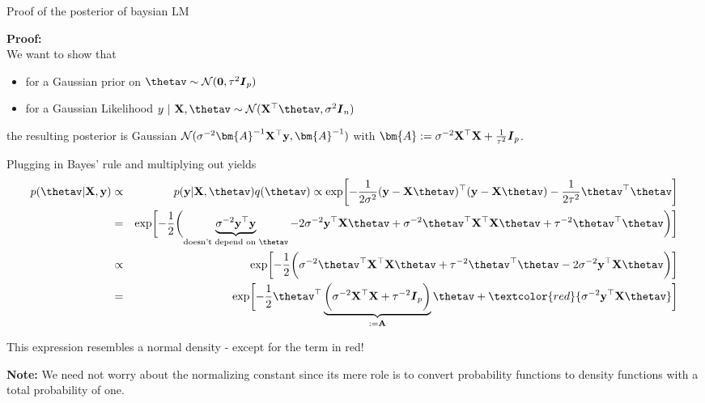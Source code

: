 \documentclass[11pt,compress,t,notes=noshow, xcolor=table]{beamer}
\begin{document}

\begin{vbframe}{Proof of the posterior of baysian LM}
\begin{footnotesize}
\textbf{Proof:}\\
    We want to show that 
    \begin{itemize}
      \item for a Gaussian prior on $\thetav \sim \mathcal{N}(\zero, \tau^2 \id_p)$
      \item for a Gaussian Likelihood $y ~|~ \Xmat, \thetav \sim \mathcal{N}(\Xmat^\top \thetav, \sigma^2 \id_n)$ 
    \end{itemize}
    the resulting posterior is Gaussian $\mathcal{N}(\sigma^{-2}\bm{A}^{-1}\Xmat^\top\yv, \bm{A}^{-1})$ with $\bm{A}:= \sigma^{-2}\Xmat^\top\Xmat + \frac{1}{\tau^2} \id_p$.
    
    Plugging in Bayes' rule and multiplying out yields
    \begin{eqnarray*}
    p(\thetav | \Xmat, \yv) &\propto& p(\yv | \Xmat, \thetav) q(\thetav) \propto \exp\biggl[-\frac{1}{2\sigma^2}(\yv - \Xmat\thetav)^\top(\yv - \Xmat\thetav)-\frac{1}{2\tau^2}\thetav^\top\thetav\biggr] \\
    &=& \exp\biggl[-\frac{1}{2}\biggl(\underbrace{\sigma^{-2}\yv^\top\yv}_{\text{doesn't depend on } \thetav} - 2 \sigma^{-2} \yv^\top \Xmat \thetav + \sigma^{-2}\thetav^\top \Xmat^\top \Xmat \thetav  + \tau^{-2} \thetav^\top\thetav \biggr)\biggr] \\
    &\propto& \exp\biggl[-\frac{1}{2}\biggl(\sigma^{-2}\thetav^\top \Xmat^\top \Xmat \thetav  + \tau^{-2} \thetav^\top\thetav  - 2 \sigma^{-2} \yv^\top \Xmat \thetav \biggr)\biggr] \\
    &=& \exp\biggl[-\frac{1}{2}\thetav^\top\underbrace{\biggl(\sigma^{-2} \Xmat^\top \Xmat + \tau^{-2} \id_p \biggr)}_{:= \Amat} \thetav + \textcolor{red}{\sigma^{-2} \yv^\top \Xmat \thetav}\biggr]
    \end{eqnarray*}
    
    This expression resembles a normal density - except for the term in red!
    
    \framebreak

    \textbf{Note:} We need not worry about the normalizing constant since its mere role is to convert probability functions to density functions with a total probability of one.
    

\end{footnotesize}
\end{vbframe}
\end{document}
